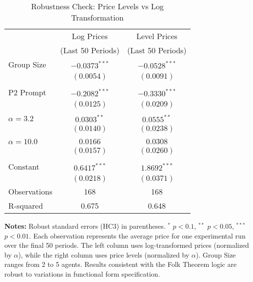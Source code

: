 \begin{table}[H]
    \centering
    \caption{Robustness Check: Price Levels vs Log Transformation}
    \label{tab:robustness_price_specification}
    \begin{threeparttable}
    \begin{tabular}{lcc}
    \toprule
     & Log Prices & Level Prices \\
     & (Last 50 Periods) & (Last 50 Periods) \\
    \midrule
    Group Size & $-0.0373^{***}$ & $-0.0528^{***}$ \\
     & $(0.0054)$ & $(0.0091)$ \\
    \\
    P2 Prompt & $-0.2082^{***}$ & $-0.3330^{***}$ \\
     & $(0.0125)$ & $(0.0209)$ \\
    \\
    $\alpha = 3.2$ & $0.0303^{**}$ & $0.0555^{**}$ \\
     & $(0.0140)$ & $(0.0238)$ \\
    \\
    $\alpha = 10.0$ & $0.0166$ & $0.0308$ \\
     & $(0.0157)$ & $(0.0260)$ \\
    \\
    Constant & $0.6417^{***}$ & $1.8692^{***}$ \\
     & $(0.0218)$ & $(0.0371)$ \\
    \midrule
    Observations & 168 & 168 \\
    R-squared & 0.675 & 0.648 \\
    \bottomrule
    \end{tabular}
    \begin{tablenotes}[flushleft]
    \footnotesize
    \item \textbf{Notes:} Robust standard errors (HC3) in parentheses. $^{*}$ $p<0.1$, $^{**}$ $p<0.05$, $^{***}$ $p<0.01$. Each observation represents the average price for one experimental run over the final 50 periods. The left column uses log-transformed prices (normalized by $\alpha$), while the right column uses price levels (normalized by $\alpha$). Group Size ranges from 2 to 5 agents. Results consistent with the Folk Theorem logic are robust to variations in functional form specification.
    \end{tablenotes}
    \end{threeparttable}
\end{table}

